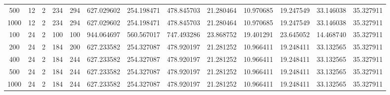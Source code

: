 \begin{table}[h]
\begin{tabular}{ccccccccccccc}
500 & 12 & 2 & 234 & 294 & 627.029602 & 254.198471 & 478.845703 & 21.280464 & 10.970685 & 19.247549 & 33.146038 & 35.327911 \\
1000 & 12 & 2 & 234 & 294 & 627.029602 & 254.198471 & 478.845703 & 21.280464 & 10.970685 & 19.247549 & 33.146038 & 35.327911 \\
100 & 24 & 2 & 100 & 100 & 944.064697 & 560.567017 & 747.493286 & 23.868752 & 19.401291 & 23.645052 & 14.468740 & 35.327911 \\
200 & 24 & 2 & 184 & 200 & 627.233582 & 254.327087 & 478.920197 & 21.281252 & 10.966411 & 19.248411 & 33.132565 & 35.327911 \\
400 & 24 & 2 & 184 & 244 & 627.233582 & 254.327087 & 478.920197 & 21.281252 & 10.966411 & 19.248411 & 33.132565 & 35.327911 \\
500 & 24 & 2 & 184 & 244 & 627.233582 & 254.327087 & 478.920197 & 21.281252 & 10.966411 & 19.248411 & 33.132565 & 35.327911 \\
1000 & 24 & 2 & 184 & 244 & 627.233582 & 254.327087 & 478.920197 & 21.281252 & 10.966411 & 19.248411 & 33.132565 & 35.327911 \\
\bottomrule
\end{tabular}
\end{table}
